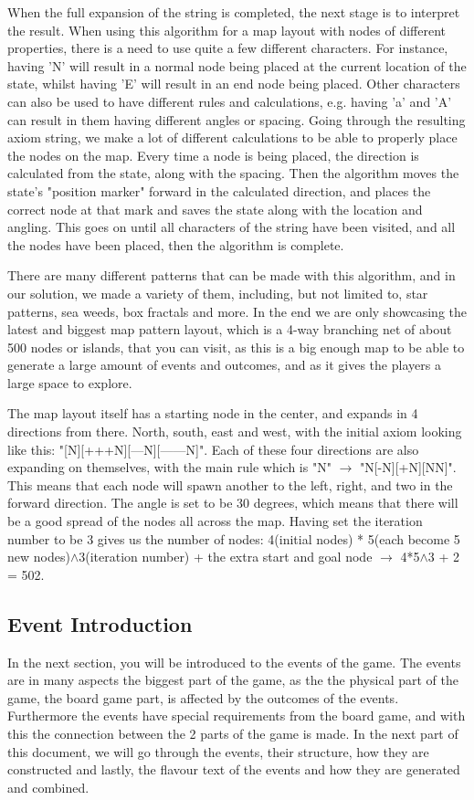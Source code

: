 When the full expansion of the string is completed, the next stage is to interpret the result. When using this algorithm for a map layout with nodes of different properties, there is a need to use quite a few different characters. For instance, having 'N' will result in a normal node being placed at the current location of the state, whilst having 'E' will result in an end node being placed. Other characters can also be used to have different rules and calculations, e.g. having 'a' and 'A' can result in them having different angles or spacing.
Going through the resulting axiom string, we make a lot of different calculations to be able to properly place the nodes on the map. Every time a node is being placed, the direction is calculated from the state, along with the spacing. Then the algorithm moves the state's "position marker" forward in the calculated direction, and places the correct node at that mark and saves the state along with the location and angling.
This goes on until all characters of the string have been visited, and all the nodes have been placed, then the algorithm is complete.

There are many different patterns that can be made with this algorithm, and in our solution, we made a variety of them, including, but not limited to, star patterns, sea weeds, box fractals and more. 
In the end we are only showcasing the latest and biggest map pattern layout, which is a 4-way branching net of about 500 nodes or islands, that you can visit, as this is a big enough map to be able to generate a large amount of events and outcomes, and as it gives the players a large space to explore.

The map layout itself has a starting node in the center, and expands in 4 directions from there. North, south, east and west, with the initial axiom looking like this: "[N][+++N][---N][------N]". Each of these four directions are also expanding on themselves, with the main rule which is "N" $\rightarrow$ "N[-N][+N][NN]". This means that each node will spawn another to the left, right, and two in the forward direction. The angle is set to be 30 degrees, which means that there will be a good spread of the nodes all across the map. Having set the iteration number to be 3 gives us the number of nodes: 4(initial nodes) * 5(each become 5 new nodes)$\wedge$3(iteration number) + the extra start and goal node $\rightarrow$ 4*5$\wedge$3 + 2 = 502.

\subsection{Event Introduction}
In the next section, you will be introduced to the events of the game. The events are in many aspects the biggest part of the game, as the the physical part of the game, the board game part, is affected by the outcomes of the events. Furthermore the events have special requirements from the board game, and with this the connection between the 2 parts of the game is made.
In the next part of this document, we will go through the events, their structure, how they are constructed and lastly, the flavour text of the events and how they are generated and combined.

